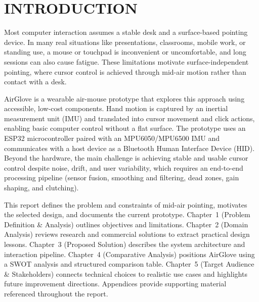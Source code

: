 \chapter*{INTRODUCTION}

Most computer interaction assumes a stable desk and a surface-based pointing device. In many real situations like presentations, classrooms, mobile work, or standing use, a mouse or touchpad is inconvenient or uncomfortable, and long sessions can also cause fatigue. These limitations motivate surface-independent pointing, where cursor control is achieved through mid-air motion rather than contact with a desk.

AirGlove is a wearable air-mouse prototype that explores this approach using accessible, low-cost components. Hand motion is captured by an inertial measurement unit (IMU) and translated into cursor movement and click actions, enabling basic computer control without a flat surface. The prototype uses an ESP32 microcontroller paired with an MPU6050/MPU6500 IMU and communicates with a host device as a Bluetooth Human Interface Device (HID). Beyond the hardware, the main challenge is achieving stable and usable cursor control despite noise, drift, and user variability, which requires an end-to-end processing pipeline (sensor fusion, smoothing and filtering, dead zones, gain shaping, and clutching).

This report defines the problem and constraints of mid-air pointing, motivates the selected design, and documents the current prototype. Chapter~1 (Problem Definition \& Analysis) outlines objectives and limitations. Chapter~2 (Domain Analysis) reviews research and commercial solutions to extract practical design lessons. Chapter~3 (Proposed Solution) describes the system architecture and interaction pipeline. Chapter~4 (Comparative Analysis) positions AirGlove using a SWOT analysis and structured comparison table. Chapter~5 (Target Audience \& Stakeholders) connects technical choices to realistic use cases and highlights future improvement directions. Appendices provide supporting material referenced throughout the report.